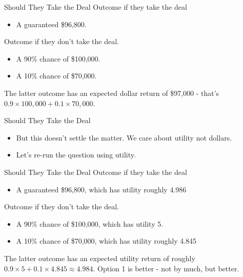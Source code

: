 \documentclass[
  ignorenonframetext,
]{beamer}
\providecommand{\tightlist}{%
  \setlength{\itemsep}{0pt}\setlength{\parskip}{0pt}}
\renewcommand{\,}{\text{, }}
\begin{document}
\begin{frame}{Should They Take the Deal}
\protect\hypertarget{should-they-take-the-deal}{}
Outcome if they take the deal

\begin{itemize}
\tightlist
\item
  A guaranteed \$96,800. \pause
\end{itemize}

Outcome if they don't take the deal.

\begin{itemize}
\tightlist
\item
  A 90\% chance of \$100,000.
\item
  A 10\% chance of \$70,000. \pause
\end{itemize}

The latter outcome has an expected dollar return of \$97,000 - that's
\(0.9 \times 100,000 + 0.1 \times 70,000\).
\end{frame}

\begin{frame}{Should They Take the Deal}
\protect\hypertarget{should-they-take-the-deal-1}{}
\begin{itemize}
\tightlist
\item
  But this doesn't settle the matter. We care about utility not dollars.
\item
  Let's re-run the question using utility.
\end{itemize}
\end{frame}

\begin{frame}{Should They Take the Deal}
\protect\hypertarget{should-they-take-the-deal-2}{}
Outcome if they take the deal

\begin{itemize}
\tightlist
\item
  A guaranteed \$96,800, which has utility roughly 4.986 \pause
\end{itemize}

Outcome if they don't take the deal.

\begin{itemize}
\tightlist
\item
  A 90\% chance of \$100,000, which has utility 5.
\item
  A 10\% chance of \$70,000, which has utility roughly 4.845 \pause
\end{itemize}

The latter outcome has an expected utility return of roughly
\(0.9 \times 5 + 0.1 \times 4.845 \approx 4.984\). Option 1 is better -
not by much, but better.
\end{frame}
\end{document}
